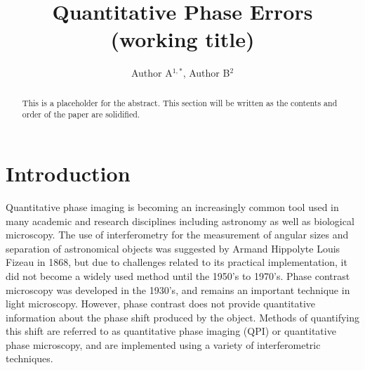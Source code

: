 \documentclass[10pt,letterpaper]{article}
\begin{document}
\title{Quantitative Phase Errors (working title)}

\author{Author A$^{1,*}$, Author B$^{2}$}

\address{$^1$Division of Aerospace Engineering, California Institute of Technology, 1200 E. California Blvd., Pasadena CA 91125, USA\\
$^2$Jet Propulsion Laboratory, California Institute of Technology, 4800 Oak Grove Dr., Pasadena, CA. 91109, USA}




\begin{abstract}
This is a placeholder for the abstract. This section will be written as the contents and order of the paper are solidified.
\end{abstract}






\section{Introduction}


Quantitative phase imaging is becoming an increasingly common tool used in many academic and research disciplines including astronomy as well as biological microscopy. The use of interferometry for the measurement of angular sizes and separation of astronomical objects was suggested by Armand Hippolyte Louis Fizeau in 1868, but due to challenges related to its practical implementation, it did not become a widely used method until the 1950's to 1970's\cite{tango1980iv}. Phase contrast microscopy was developed in the 1930’s, and remains an important technique in light microscopy\cite{burch1942phase, zernike1934diffraction}. However, phase contrast does not provide quantitative information about the phase shift produced by the object. Methods of quantifying this shift are referred to as quantitative phase imaging (QPI) or quantitative phase microscopy, and are implemented using a variety of interferometric techniques\cite{gureyev1997rapid, lue2007quantitative, cuche1999digital}.\par
\end{document}

